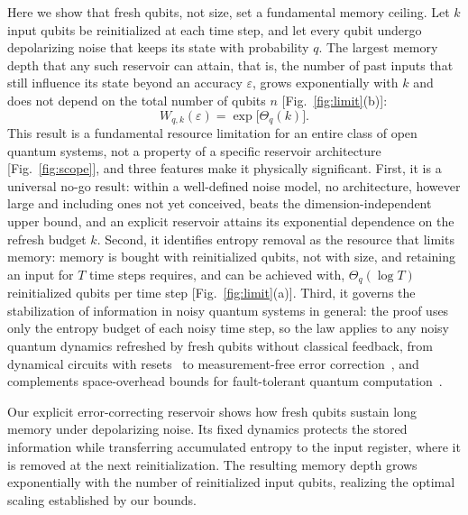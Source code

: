 \documentclass[aps,prl,twocolumn,superscriptaddress,floatfix]{revtex4-2}
\theoremstyle{plain}
\begin{document}
Here we show that fresh qubits, not size, set a fundamental memory ceiling. Let $k$ input qubits be reinitialized at each time step, and let every qubit undergo depolarizing noise that keeps its state with probability $q$. The largest memory depth that any such reservoir can attain, that is, the number of past inputs that still influence its state beyond an accuracy $\varepsilon$, grows exponentially with $k$ and does not depend on the total number of qubits $n$ [Fig.~\ref{fig:limit}(b)]:
\begin{equation}
W_{q,k}(\varepsilon)=\exp\!\big[\Theta_q(k)\big].
\label{eq:main}
\end{equation}
This result is a fundamental resource limitation for an entire class of open quantum systems, not a property of a specific reservoir architecture [Fig.~\ref{fig:scope}], and three features make it physically significant. First, it is a universal no-go result: within a well-defined noise model, no architecture, however large and including ones not yet conceived, beats the dimension-independent upper bound, and an explicit reservoir attains its exponential dependence on the refresh budget $k$. Second, it identifies entropy removal as the resource that limits memory: memory is bought with reinitialized qubits, not with size, and retaining an input for $T$ time steps requires, and can be achieved with, $\Theta_q(\log T)$ reinitialized qubits per time step [Fig.~\ref{fig:limit}(a)]. Third, it governs the stabilization of information in noisy quantum systems in general: the proof uses only the entropy budget of each noisy time step, so the law applies to any noisy quantum dynamics refreshed by fresh qubits without classical feedback, from dynamical circuits with resets~\cite{Yasuda2023,Hu2024} to measurement-free error correction~\cite{Heussen2024}, and complements space-overhead bounds for fault-tolerant quantum computation~\cite{Fawzi2022}.

Our explicit error-correcting reservoir shows how fresh qubits sustain long memory under depolarizing noise. Its fixed dynamics protects the stored information while transferring accumulated entropy to the input register, where it is removed at the next reinitialization. The resulting memory depth grows exponentially with the number of reinitialized input qubits, realizing the optimal scaling established by our bounds.
\end{document}
